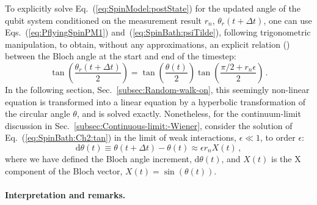 To explicitly solve Eq.~(\ref{eq:SpinModel:postState}) for the updated
angle of the qubit system conditioned on the measurement result $r_{n}$,
$\theta_{r}\left(t+\Delta t\right)$, one can use Eqs.~(\ref{eq:PflyingSpinPM1})
and~(\ref{eq:SpinBath:psiTilde}), following trigonometric manipulation,
to obtain, without any approximations, an explicit relation (\citeauthor{MHD})
between the Bloch angle at the start and end of the timestep: 
\begin{equation}
\boxed{\tan\left(\frac{\theta_{r}\left(t+\Delta t\right)}{2}\right)=\tan\left(\frac{\theta\left(t\right)}{2}\right)\tan\left(\frac{\pi/2+r_{n}\epsilon}{2}\right)\,.}\label{eq:SpinBath:Ch2:tan}
\end{equation}
In the following section, Sec.~\ref{subsec:Random-walk-on}, this
seemingly non-linear equation is transformed into a linear equation
by a hyperbolic transformation of the circular angle $\theta$, and
is solved exactly. Nonetheless, for the continuum-limit discussion
in Sec.~\ref{subsec:Continuous-limit:-Wiener}, consider the solution
of Eq.~(\ref{eq:SpinBath:Ch2:tan}) in the limit of weak interactions,
$\epsilon\ll1$, to order $\epsilon$: 
\begin{equation}
\mathrm{d}\theta\left(t\right)\equiv\theta\left(t+\Delta t\right)-\theta\left(t\right)\approx\epsilon r_{n}X\left(t\right)\,,\label{eq:SPinBath:ThPM}
\end{equation}
where we have defined the Bloch angle increment, $\mathrm{d}\theta\left(t\right)$,
and $X\left(t\right)$ is the X component of the Bloch vector, $X\left(t\right)=\sin\left(\theta\left(t\right)\right)$. 

\paragraph{Interpretation and remarks. }

